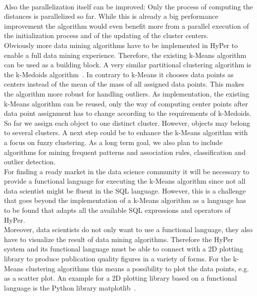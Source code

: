 \\
Also the parallelization itself can be improved: Only the process of computing the distances is parallelized so far. While this is already a big performance improvement the algorithm would even benefit more from a parallel execution of the initialization process and of the updating of the cluster centers.
\\
Obviously more data mining algorithms have to be implemented in HyPer to enable a full data mining experience. Therefore, the existing k-Means algorithm can be used as a building block. A very similar partitional clustering algorithm is the k-Medoids algorithm~\parencite{medoid}. In contrary to k-Means it chooses data points as centers instead of the mean of the mass of all assigned data points. This makes the algorithm more robust for handling outliers. As implementation, the existing k-Means algorithm can be reused, only the way of computing center points after data point assignment has to change according to the requirements of k-Medoids. 
\\
So far we assign each object to one distinct cluster. However, objects may belong to several clusters. A next step could be to enhance the k-Means algorithm with a focus on fuzzy clustering. As a long term goal, we also plan to include algorithms for mining frequent patterns and association rules, classification and outlier detection.
\\
For finding a ready market in the data science community it will be necessary to provide a functional language for executing the k-Means algorithm since not all data scientist might be fluent in the SQL language. However, this is a challenge that goes beyond the implementation of a k-Means algorithm as a language has to be found that adapts all the available SQL expressions and operators of HyPer.
\\
Moreover, data scientists do not only want to use a functional language, they also have to visualize the result of data mining algorithms. Therefore the HyPer system and its functional language must be able to connect with a 2D plotting library to produce publication quality figures in a variety of forms. For the k-Means clustering algorithms this means a possibility to plot the data points, e.g. as a scatter plot. An example for a 2D plotting library based on a functional language is the Python library matplotlib~\parencite{Hunter:2007}. 





